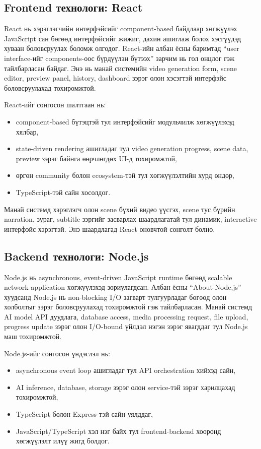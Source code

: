 \subsection{Frontend технологи: React}

React нь хэрэглэгчийн интерфэйсийг component-based байдлаар хөгжүүлэх JavaScript сан бөгөөд интерфэйсийг жижиг, дахин ашиглаж болох хэсгүүдэд хуваан боловсруулах боломж олгодог. React-ийн албан ёсны баримтад ``user interface-ийг components-оос бүрдүүлэн бүтээх'' зарчим нь гол онцлог гэж тайлбарласан байдаг. Энэ нь манай системийн video generation form, scene editor, preview panel, history, dashboard зэрэг олон хэсэгтэй интерфэйс боловсруулахад тохиромжтой.

React-ийг сонгосон шалтгаан нь:

\begin{itemize}
\item component-based бүтэцтэй тул интерфэйсийг модульчилж хөгжүүлэхэд хялбар,
\item state-driven rendering ашигладаг тул video generation progress, scene data, preview зэрэг байнга өөрчлөгдөх UI-д тохиромжтой,
\item өргөн community болон ecosystem-тэй тул хөгжүүлэлтийн хурд өндөр,
\item TypeScript-тэй сайн хосолдог.
\end{itemize}

Манай системд хэрэглэгч олон scene бүхий видео үүсгэх, scene тус бүрийн narration, зураг, subtitle зэргийг засварлах шаардлагатай тул динамик, interactive интерфэйс хэрэгтэй. Энэ шаардлагад React оновчтой сонголт болно.

\subsection{Backend технологи: Node.js}

Node.js нь asynchronous, event-driven JavaScript runtime бөгөөд scalable network application хөгжүүлэхэд зориулагдсан. Албан ёсны ``About Node.js'' хуудсанд Node.js нь non-blocking I/O загварт тулгуурладаг бөгөөд олон холболтыг зэрэг боловсруулахад тохиромжтой гэж тайлбарласан. Манай системд AI model API дуудлага, database access, media processing request, file upload, progress update зэрэг олон I/O-bound үйлдэл нэгэн зэрэг явагддаг тул Node.js маш тохиромжтой.

Node.js-ийг сонгосон үндэслэл нь:

\begin{itemize}
\item asynchronous event loop ашигладаг тул API orchestration хийхэд сайн,
\item AI inference, database, storage зэрэг олон service-тэй зэрэг харилцахад тохиромжтой,
\item TypeScript болон Express-тэй сайн уялддаг,
\item JavaScript/TypeScript хэл нэг байх тул frontend-backend хооронд хөгжүүлэлт илүү жигд болдог.
\end{itemize}


